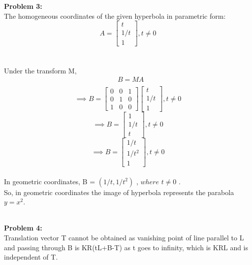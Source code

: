 \documentclass[a4paper]{article}
\begin{document}
\maketitle
\hrulefill
\\ \\
\textbf{Problem 3:} \\
The homogeneous coordinates of the given hyperbola in parametric form:
\[
A = 
\begin{bmatrix}
t \\
1/t \\
1
\end{bmatrix}
, t \neq 0 \]
\\  \\
Under the transform M,
\begin{equation*}
\begin{split}
& B = MA \\
\end{split}
\end{equation*}
\[
\implies
B =
\begin{bmatrix}
    0 & 0 & 1  \\
    0 & 1 & 0  \\
    1 & 0 & 0
    \end{bmatrix}
    \begin{bmatrix}
    t \\
    1/t \\
    1
    \end{bmatrix}
    , t \neq 0 
\]
\[
\implies
B = 
\begin{bmatrix}
1 \\ 
1/t \\
t
\end{bmatrix}
, t \neq 0
\]
\[
\implies
B = 
\begin{bmatrix}
1/t \\ 
1/t^2 \\
1
\end{bmatrix}
, t \neq 0
\]
\\
In geometric coordinates, B = $ (1/t, 1/t^2)$ , $ where $ $ t \neq 0 $ . \\
So, in geometric coordinates the image of hyperbola represents the parabola $ y = x^2. $  

\hrulefill\\

\textbf{Problem 4:} \\


Translation vector T cannot be obtained as vanishing point of line parallel to L and passing through B is KR(tL+B-T) as t goes to infinity, which is KRL and is independent of T.
\end{document}
